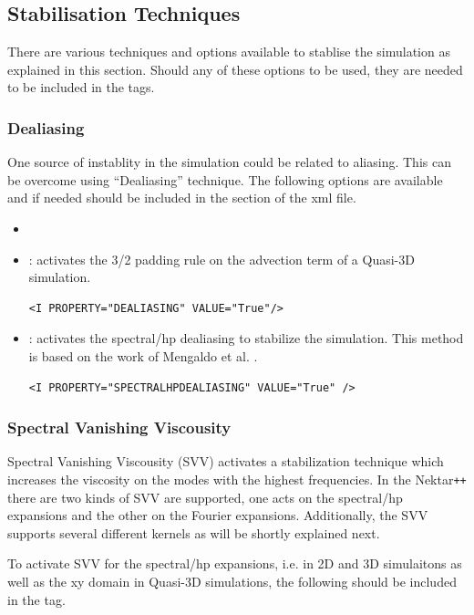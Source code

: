 \subsection{Stabilisation Techniques}
There are various techniques and options available to stablise the simulation as
explained in this section. Should any of these options to be used, they are 
needed to be included in the  tags.
\subsubsection{Dealiasing}
One source of instablity in the simulation could be related to aliasing. This can
be overcome using ``Dealiasing'' technique. The following options are available
and if needed should be included in the  section of the xml file.
\begin{itemize}
\item {} 
\item {}: activates the 3/2 padding
rule on the advection term of a Quasi-3D simulation.
\begin{lstlisting}[style=XMLStyle]
<I PROPERTY="DEALIASING" VALUE="True"/>
\end{lstlisting}

\item {}: activates the spectral/hp dealiasing to
stabilize the simulation. This method is based on the work of Mengaldo et al. \cite{mengaldo2015dealiasing}.
\begin{lstlisting}[style=XMLStyle]
<I PROPERTY="SPECTRALHPDEALIASING" VALUE="True" />
\end{lstlisting}
\end{itemize}

\subsubsection{Spectral Vanishing Viscousity}
Spectral Vanishing Viscousity (SVV) activates a stabilization technique
which increases the viscosity on the modes with the highest frequencies. In the
Nektar\texttt{++} there are two kinds of SVV are supported, one acts on the 
spectral/hp expansions and the other on the Fourier expansions. Additionally, the
SVV supports several different kernels as will be shortly explained next.



To activate SVV for the spectral/hp expansions, i.e. in 2D and 3D simulaitons 
as well as the xy domain in Quasi-3D simulations, the following should be 
included in the  tag.

